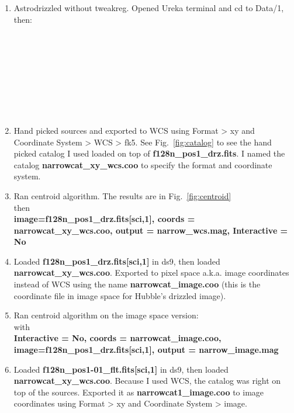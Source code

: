 \documentclass[11pt,obeyspaces]{article} %
\begin{document}
\begin{enumerate}
\item Astrodrizzled without tweakreg. Opened Ureka terminal and cd to Data/1, then: \\
 \\
 \\
 \\
 \\
\\
\\
\\
\\ 
\item Hand picked sources and exported to WCS using Format > xy and Coordinate System > WCS > fk5. See Fig.~\ref{fig:catalog} to see the hand picked catalog I used loaded on top of {\bf f128n\_pos1\_drz.fits}. I named the catalog {\bf narrowcat\_xy\_wcs.coo} to specify the format and coordinate system. 
\item Ran centroid algorithm. The results are in Fig.~\ref{fig:centroid} \\
 then \\
{\bf  image=f128n\_pos1\_drz.fits[sci,1], coords = narrowcat\_xy\_wcs.coo, output = narrow\_wcs.mag, Interactive = No} 
\item Loaded {\bf f128n\_pos1\_drz.fits[sci,1]} in ds9, then loaded {\bf narrowcat\_xy\_wcs.coo}. Exported to pixel space a.k.a. image coordinates instead of WCS using the name {\bf narrowcat\_image.coo} (this is the coordinate file in image space for Hubble's drizzled image). 
\item Ran centroid algorithm on the image space version: \\
 with \\
{\bf Interactive = No, coords = narrowcat\_image.coo, image=f128n\_pos1\_drz.fits[sci,1], output = narrow\_image.mag} 
\item Loaded {\bf f128n\_pos1-01\_flt.fits[sci,1]} in ds9, then loaded {\bf narrowcat\_xy\_wcs.coo}. Because I used WCS, the catalog was right on top of the sources. Exported it as {\bf narrowcat1\_image.coo} to image coordinates using Format > xy and Coordinate System > image. 

\end{enumerate}
\end{document}

